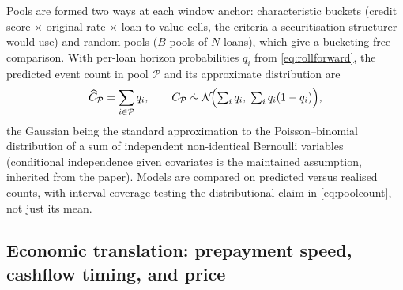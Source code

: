 Pools are formed two ways at each window anchor: characteristic
buckets (credit score $\times$ original rate $\times$
loan-to-value cells, the criteria a securitisation structurer would
use) and random pools ($B$ pools of $N$ loans), which give a
bucketing-free comparison.  With per-loan horizon probabilities $q_i$
from \eqref{eq:rollforward}, the predicted event count in pool
$\mathcal{P}$ and its approximate distribution are
\begin{equation}
\label{eq:poolcount}
\widehat{C}_{\mathcal{P}} = \sum_{i\in\mathcal{P}} q_i,
\qquad
C_{\mathcal{P}} \;\dot\sim\;
\mathcal{N}\!\Bigl(\textstyle\sum_i q_i,\; \sum_i q_i(1-q_i)\Bigr),
\end{equation}
the Gaussian being the standard approximation to the
Poisson--binomial distribution of a sum of independent non-identical
Bernoulli variables (conditional independence given covariates is the
maintained assumption, inherited from the paper).  Models are
compared on predicted versus realised counts, with interval coverage
testing the distributional claim in \eqref{eq:poolcount}, not just
its mean.

\subsection{Economic translation: prepayment speed, cashflow timing, and price}
\label{subsec:meth-econ}

